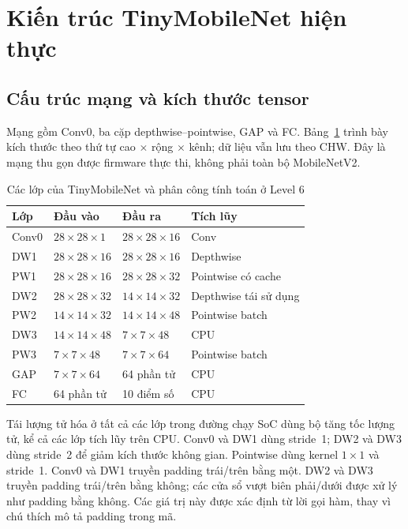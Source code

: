 \section{Kiến trúc TinyMobileNet hiện thực}
\subsection{Cấu trúc mạng và kích thước tensor}
Mạng gồm Conv0, ba cặp depthwise--pointwise, GAP và FC. Bảng~\ref{tab:network-current} trình bày kích thước theo thứ tự cao $\times$ rộng $\times$ kênh; dữ liệu vẫn lưu theo CHW. Đây là mạng thu gọn được firmware thực thi, không phải toàn bộ MobileNetV2.

\begin{table}[!ht]
\renewcommand{\arraystretch}{1.12}
\centering
\caption{Các lớp của TinyMobileNet và phân công tính toán ở Level 6}
\label{tab:network-current}
\small
\begin{tabular}{llll}
\hline
Lớp & Đầu vào & Đầu ra & Tích lũy \\
\hline
Conv0 & $28\times28\times1$ & $28\times28\times16$ & Conv \\
DW1 & $28\times28\times16$ & $28\times28\times16$ & Depthwise \\
PW1 & $28\times28\times16$ & $28\times28\times32$ & Pointwise có cache \\
DW2 & $28\times28\times32$ & $14\times14\times32$ & Depthwise tái sử dụng \\
PW2 & $14\times14\times32$ & $14\times14\times48$ & Pointwise batch \\
DW3 & $14\times14\times48$ & $7\times7\times48$ & CPU \\
PW3 & $7\times7\times48$ & $7\times7\times64$ & Pointwise batch \\
GAP & $7\times7\times64$ & 64 phần tử & CPU \\
FC & 64 phần tử & 10 điểm số & CPU \\
\hline
\end{tabular}
\end{table}
Tái lượng tử hóa ở tất cả các lớp trong đường chạy SoC dùng bộ tăng tốc lượng tử, kể cả các lớp tích lũy trên CPU. Conv0 và DW1 dùng stride~1; DW2 và DW3 dùng stride~2 để giảm kích thước không gian. Pointwise dùng kernel $1\times1$ và stride~1. Conv0 và DW1 truyền padding trái/trên bằng một. DW2 và DW3 truyền padding trái/trên bằng không; các cửa sổ vượt biên phải/dưới được xử lý như padding bằng không. Các giá trị này được xác định từ lời gọi hàm, thay vì chú thích mô tả padding trong mã.

